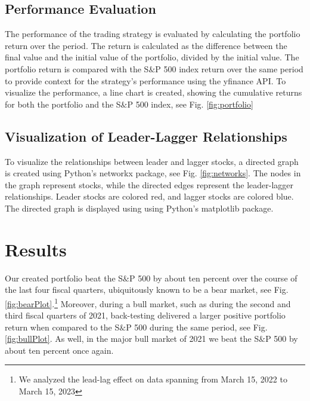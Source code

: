 \documentclass{article}
\begin{document}
\subsection{Performance Evaluation}
The performance of the trading strategy is evaluated by calculating the portfolio return over the period. The return is calculated as the difference between the final value and the initial value of the portfolio, divided by the initial value. The portfolio return is compared with the S$\&$P 500 index return over the same period to provide context for the strategy's performance using the {\selectfont
yfinance} API. To visualize the performance, a line chart is created, showing the cumulative returns for both the portfolio and the S$\&$P 500 index, see Fig. \ref{fig:portfolio}
\subsection{Visualization of Leader-Lagger Relationships}
To visualize the relationships between leader and lagger stocks, a directed graph is created using Python's {\selectfont
networkx} package, see Fig. \ref{fig:networks}. The nodes in the graph represent stocks, while the directed edges represent the leader-lagger relationships. Leader stocks are colored red, and lagger stocks are colored blue. The directed graph is displayed using using Python's {\selectfont
matplotlib} package.
\section{Results}
Our created portfolio beat the S$\&$P 500 by about ten percent over the course of the last four fiscal quarters, ubiquitously known to be a bear market, see Fig. \ref{fig:bearPlot}.\footnote{We analyzed the lead-lag effect on data spanning from March 15, 2022 to March 15, 2023} Moreover, during a bull market, such as during the second and third fiscal quarters of 2021, back-testing delivered a larger positive portfolio return when compared to the S$\&$P 500 during the same period, see Fig. \ref{fig:bullPlot}. As well, in the major bull market of 2021 we beat the S$\&$P 500 by about ten percent once again.
\end{document}
